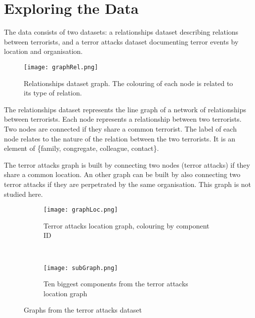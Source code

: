 \section{Exploring the Data}
\label{sec:Exploring the Data}

The data consists of two datasets: a relationships dataset describing relations between terrorists, and a terror attacks dataset documenting terror events by location and organisation.


\begin{figure}[H]
\begin{center}

        \texttt{[image: graphRel.png]}
        \label{fig:graphLoc}
        \caption{Relationships dataset graph. The colouring of each node is related to its type of relation.}
        
\end{center}
\end{figure}

The relationships dataset represents the line graph of a network of relationships between terrorists. Each node represents a relationship between two terrorists. Two nodes are connected if they share a common terrorist. %
The label of each node relates to the nature of the relation between the two terrorists. It is an element of \{family, congregate, colleague, contact\}.


The terror attacks graph is built by connecting two nodes (terror attacks) if they share a common location. An other graph can be built by also connecting two terror attacks if they are perpetrated by the same organisation. This graph is not studied here.

\begin{figure}[t]
\begin{center}
    \begin{subfigure}[b]{0.45\textwidth}
        \texttt{[image: graphLoc.png]}
        \caption{Terror attacks location graph, colouring by component ID}
        \label{fig:graphLoc}
    \end{subfigure}
    ~
    \begin{subfigure}[b]{0.45\textwidth}
        \texttt{[image: subGraph.png]}
        \caption{Ten biggest components from the terror attacks location graph}
        \label{fig:subGraph}
    \end{subfigure}
\caption{Graphs from the terror attacks dataset}
\label{fig:graphPlots}
\end{center}
\end{figure}

